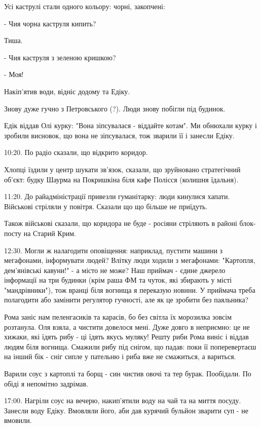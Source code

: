 Усі каструлі стали одного кольору: чорні, закопчені:

- Чия чорна каструля кипить?

Тиша.

- Чия каструля з зеленою кришкою?

- Моя!

Накіп'ятив води, відніс додому та Едіку.

Знову дуже гучно з Петровського (?). Люди знову побігли під будинок.

Едік віддав Олі курку: "Вона зіпсувалася - віддайте котам". Ми обнюхали курку і
зробили висновок, що вона не зіпсувалася, тож зварили її і занесли Едіку. 


10:20. По радіо сказали, що відкрито коридор.

Хлопці їздили у центр шукати зв'язок, сказали, що зруйновано стратегічний
об'єкт: будку Шаурма на Покришкіна біля кафе Полісся (колишня їдальня).

11:20. До райадміністрації привезли гуманітарку: люди кинулися хапати.
Військові стріляли у повітря. Сказали що що більше не приїдуть.

Також військові сказали, що коридора не буде - росіяни стріляють в районі
блок-посту на Старий Крим. 


12:30. Могли ж налагодити оповіщення: наприклад,  пустити машини з мегафонами,
інформувати людей? Влітку люди ходили з мегафонами: "Картопля, дем'янівські
кавуни!" - а місто не може? Наш приймач - єдине джерело інформації на три
будинки (крім раша ФМ та чуток, які збирають у місті "мандрівники"), тож вранці
біля вогнища я переказую новини. У приймача треба полагодити або замінити
регулятор гучності, але як це зробити без паяльника?


Рома заніс нам пеленгасиків та карасів, бо без світла їх морозилка зовсім
розтанула. Оля взяла, а чистити довелося мені. Дуже довго в неприємно: це не
хижаки, які їдять рибу - ці їдять якусь муляку! Решту риби Рома виніс і віддав
людям біля вогнища. Смажили рибу під снігом, що падав: поки її поперевертаєш на
інший бік - сніг сипле у пательню і риба вже не смажиться, а вариться.

Варили соус з картоплі та борщ - син чистив овочі та тер бурак. Пообідали. По
обіді я непомітно задрімав.

17:00. Нагріли соус на вечерю, накип'ятили воду на чай та на миття посуду.
Занесли воду Едіку. Вмовляли його, аби дав курячий бульйон зварити суп - не
вмовили.


